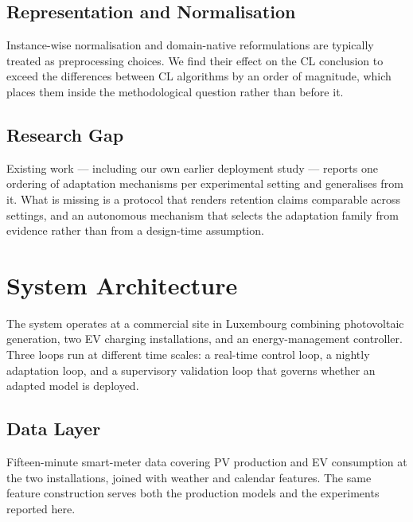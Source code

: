 \documentclass[journal]{IEEEtran}
\begin{document}
\subsection{Representation and Normalisation}
Instance-wise normalisation and domain-native reformulations are typically
treated as preprocessing choices. We find their effect on the CL conclusion to
exceed the differences between CL algorithms by an order of magnitude, which
places them inside the methodological question rather than before it.

\subsection{Research Gap}
\label{sec:gap}
Existing work --- including our own earlier deployment study --- reports one
ordering of adaptation mechanisms per experimental setting and generalises from
it. What is missing is a protocol that renders retention claims comparable
across settings, and an autonomous mechanism that selects the adaptation family
from evidence rather than from a design-time assumption.

\section{System Architecture}
\label{sec:arch}


The system operates at a commercial site in Luxembourg combining photovoltaic
generation, two EV charging installations, and an energy-management controller.
Three loops run at different time scales: a real-time control loop, a nightly
adaptation loop, and a supervisory validation loop that governs whether an
adapted model is deployed.

\subsection{Data Layer}
Fifteen-minute smart-meter data covering PV production and EV consumption at the
two installations, joined with weather and calendar features. The same feature
construction serves both the production models and the experiments reported
here.

\end{document}
